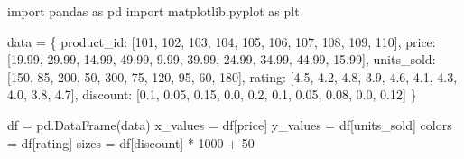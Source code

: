 \documentclass[
  polish,
  letterpaper,
  DIV=11,
  numbers=noendperiod]{scrreprt}
\newenvironment{Shaded}{\begin{snugshade}}{\end{snugshade}}
\newcommand{\DecValTok}[1]{\textcolor[rgb]{0.68,0.00,0.00}{#1}}
\newcommand{\FloatTok}[1]{\textcolor[rgb]{0.68,0.00,0.00}{#1}}
\newcommand{\ImportTok}[1]{\textcolor[rgb]{0.00,0.46,0.62}{#1}}
\newcommand{\NormalTok}[1]{\textcolor[rgb]{0.00,0.23,0.31}{#1}}
\newcommand{\OperatorTok}[1]{\textcolor[rgb]{0.37,0.37,0.37}{#1}}
\newcommand{\StringTok}[1]{\textcolor[rgb]{0.13,0.47,0.30}{#1}}
\begin{document}
\begin{Shaded}
\begin{Highlighting}[]
\ImportTok{import}\NormalTok{ pandas }\ImportTok{as}\NormalTok{ pd}
\ImportTok{import}\NormalTok{ matplotlib.pyplot }\ImportTok{as}\NormalTok{ plt}

\NormalTok{data }\OperatorTok{=}\NormalTok{ \{}
    \StringTok{\textquotesingle{}product\_id\textquotesingle{}}\NormalTok{: [}\DecValTok{101}\NormalTok{, }\DecValTok{102}\NormalTok{, }\DecValTok{103}\NormalTok{, }\DecValTok{104}\NormalTok{, }\DecValTok{105}\NormalTok{, }\DecValTok{106}\NormalTok{, }\DecValTok{107}\NormalTok{, }\DecValTok{108}\NormalTok{, }\DecValTok{109}\NormalTok{, }\DecValTok{110}\NormalTok{],}
    \StringTok{\textquotesingle{}price\textquotesingle{}}\NormalTok{: [}\FloatTok{19.99}\NormalTok{, }\FloatTok{29.99}\NormalTok{, }\FloatTok{14.99}\NormalTok{, }\FloatTok{49.99}\NormalTok{, }\FloatTok{9.99}\NormalTok{, }\FloatTok{39.99}\NormalTok{, }\FloatTok{24.99}\NormalTok{, }\FloatTok{34.99}\NormalTok{, }\FloatTok{44.99}\NormalTok{, }\FloatTok{15.99}\NormalTok{],}
    \StringTok{\textquotesingle{}units\_sold\textquotesingle{}}\NormalTok{: [}\DecValTok{150}\NormalTok{, }\DecValTok{85}\NormalTok{, }\DecValTok{200}\NormalTok{, }\DecValTok{50}\NormalTok{, }\DecValTok{300}\NormalTok{, }\DecValTok{75}\NormalTok{, }\DecValTok{120}\NormalTok{, }\DecValTok{95}\NormalTok{, }\DecValTok{60}\NormalTok{, }\DecValTok{180}\NormalTok{],}
    \StringTok{\textquotesingle{}rating\textquotesingle{}}\NormalTok{: [}\FloatTok{4.5}\NormalTok{, }\FloatTok{4.2}\NormalTok{, }\FloatTok{4.8}\NormalTok{, }\FloatTok{3.9}\NormalTok{, }\FloatTok{4.6}\NormalTok{, }\FloatTok{4.1}\NormalTok{, }\FloatTok{4.3}\NormalTok{, }\FloatTok{4.0}\NormalTok{, }\FloatTok{3.8}\NormalTok{, }\FloatTok{4.7}\NormalTok{],}
    \StringTok{\textquotesingle{}discount\textquotesingle{}}\NormalTok{: [}\FloatTok{0.1}\NormalTok{, }\FloatTok{0.05}\NormalTok{, }\FloatTok{0.15}\NormalTok{, }\FloatTok{0.0}\NormalTok{, }\FloatTok{0.2}\NormalTok{, }\FloatTok{0.1}\NormalTok{, }\FloatTok{0.05}\NormalTok{, }\FloatTok{0.08}\NormalTok{, }\FloatTok{0.0}\NormalTok{, }\FloatTok{0.12}\NormalTok{]}
\NormalTok{\}}

\NormalTok{df }\OperatorTok{=}\NormalTok{ pd.DataFrame(data)}
\NormalTok{x\_values }\OperatorTok{=}\NormalTok{ df[}\StringTok{\textquotesingle{}price\textquotesingle{}}\NormalTok{]}
\NormalTok{y\_values }\OperatorTok{=}\NormalTok{ df[}\StringTok{\textquotesingle{}units\_sold\textquotesingle{}}\NormalTok{]}
\NormalTok{colors }\OperatorTok{=}\NormalTok{ df[}\StringTok{\textquotesingle{}rating\textquotesingle{}}\NormalTok{]}
\NormalTok{sizes }\OperatorTok{=}\NormalTok{ df[}\StringTok{\textquotesingle{}discount\textquotesingle{}}\NormalTok{] }\OperatorTok{*} \DecValTok{1000} \OperatorTok{+} \DecValTok{50}


\end{Highlighting}
\end{Shaded}
\end{document}

